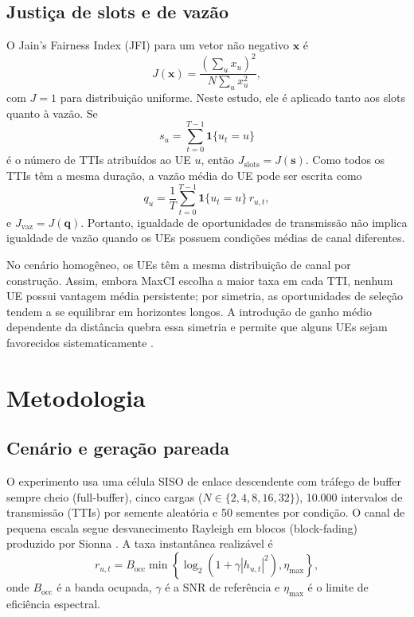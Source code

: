 \documentclass[12pt]{article}
\begin{document}
\subsection{Justiça de slots e de vazão}

O Jain's Fairness Index (JFI) para um vetor não negativo $\mathbf{x}$ é \cite{jain1984quantitativemeasurefairnessdiscrimination}
\begin{equation}
J(\mathbf{x})=\frac{(\sum_u x_u)^2}{N\sum_u x_u^2},
\end{equation}
com $J=1$ para distribuição uniforme. Neste estudo, ele é aplicado tanto aos slots quanto à vazão. Se
\begin{equation}
s_u=\sum_{t=0}^{T-1}\mathbf{1}\{u_t=u\}
\end{equation}
é o número de TTIs atribuídos ao UE $u$, então $J_{\mathrm{slots}}=J(\mathbf{s})$. Como todos os TTIs têm a mesma duração, a vazão média do UE pode ser escrita como
\begin{equation}
q_u=\frac{1}{T}\sum_{t=0}^{T-1}\mathbf{1}\{u_t=u\}\,r_{u,t},
\end{equation}
e $J_{\mathrm{vaz}}=J(\mathbf{q})$. Portanto, igualdade de oportunidades de transmissão não implica igualdade de vazão quando os UEs possuem condições médias de canal diferentes.

No cenário homogêneo, os UEs têm a mesma distribuição de canal por construção. Assim, embora MaxCI escolha a maior taxa em cada TTI, nenhum UE possui vantagem média persistente; por simetria, as oportunidades de seleção tendem a se equilibrar em horizontes longos. A introdução de ganho médio dependente da distância quebra essa simetria e permite que alguns UEs sejam favorecidos sistematicamente \cite{tse2005fundamentals}.

\section{Metodologia}

\subsection{Cenário e geração pareada}

O experimento usa uma célula SISO de enlace descendente com tráfego de buffer sempre cheio (full-buffer), cinco cargas ($N\in\{2,4,8,16,32\}$), 10.000 intervalos de transmissão (TTIs) por semente aleatória e 50 sementes por condição. O canal de pequena escala segue desvanecimento Rayleigh em blocos (block-fading) produzido por Sionna \cite{nvidiasionna2022}. A taxa instantânea realizável é
\begin{equation}
r_{u,t}=B_{\mathrm{occ}}\min\left\{\log_2(1+\gamma|h_{u,t}|^2),\eta_{\max}\right\},
\end{equation}
onde $B_{\mathrm{occ}}$ é a banda ocupada, $\gamma$ é a SNR de referência e $\eta_{\max}$ é o limite de eficiência espectral.
\end{document}
